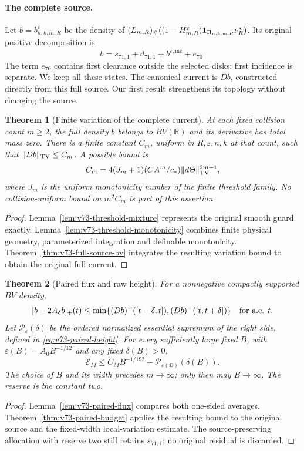 \documentclass[11pt,reqno]{amsart}
\numberwithin{equation}{section}
\newtheorem{revisiontheorem}{Theorem}
\theoremstyle{definition}\newtheorem{definition}[theorem]{Definition}
\theoremstyle{remark}\newtheorem{remark}[theorem]{Remark}
\newcommand{\R}{\mathbb R}\newcommand{\Z}{\mathbb Z}\newcommand{\T}{\mathbb T}
\theoremstyle{definition}\newtheorem{inputstatement}[theorem]{Input statement}
\begin{document}
\paragraph{The complete source.}
Let $b=b^\varepsilon_{n,k,m,R}$ be the density of
$(L_{m,R})_\#((1-H_{m,R}^\varepsilon)\mathbf1_{\Pi_{n,k,m,R}}\nu_R^*)$.
Its original positive decomposition is
\[
 b=s_{71,1}+d_{71,1}+b^{\varepsilon,\mathrm{inc}}+e_{70}.
\]
The term $e_{70}$ contains first clearance outside the selected disks;
first incidence is separate. We keep all these states. The canonical
current is $Db$, constructed directly from this full source. Our first
result strengthens its topology without changing the source.

\begin{revisiontheorem}[Finite variation of the complete current]
\label{thm:intro-v73-bv}
At each fixed collision count $m\ge2$, the full density $b$ belongs to
$BV(\R)$ and its derivative has total mass zero. There is a finite
constant $C_m$, uniform in $R,\varepsilon,n,k$ at that count, such
that $\|Db\|_{\operatorname{TV}}\le C_m$. A possible bound is
\[
 C_m=4(J_m+1)(CA^m/c_*)\|d\Theta\|_{\operatorname{TV}}^{2m+1},
\]
where $J_m$ is the uniform monotonicity number of the finite threshold
family. No collision-uniform bound on $m^2C_m$ is part of this assertion.
\end{revisiontheorem}
\begin{proof}
Lemma~\ref{lem:v73-threshold-mixture} represents the original smooth
guard exactly. Lemma~\ref{lem:v73-threshold-monotonicity} combines
finite physical geometry, parameterized integration and definable
monotonicity. Theorem~\ref{thm:v73-full-source-bv} integrates the
resulting variation bound to obtain the original full current.
\end{proof}

\begin{revisiontheorem}[Paired flux and raw height]
\label{thm:intro-v73-paired}
For a nonnegative compactly supported $BV$ density,
\[
 [b-2A_\delta b]_+(t)
 \le\min\{(Db)^+([t-\delta,t]),(Db)^-([t,t+\delta])\}
 \quad\hbox{for a.e. }t.
\]
Let $\mathcal P_\varepsilon(\delta)$ be the ordered normalized
essential supremum of the right side, defined in
\eqref{eq:v73-paired-height}. For every sufficiently large fixed $B$,
with $\varepsilon(B)=A_0B^{-1/12}$ and any fixed $\delta(B)>0$,
\begin{equation}\label{eq:intro-v73-budget}
 \mathcal E_M\le C_MB^{-1/192}
                  +\mathcal P_{\varepsilon(B)}(\delta(B)).
\end{equation}
The choice of $B$ and its width precedes $m\to\infty$; only then
may $B\to\infty$. The reserve is the constant two.
\end{revisiontheorem}
\begin{proof}
Lemma~\ref{lem:v73-paired-flux} compares both one-sided averages.
Theorem~\ref{thm:v73-paired-budget} applies the resulting bound to
the original source and the fixed-width local-variation estimate.
The source-preserving allocation with reserve two still retains
$s_{71,1}$; no original residual is discarded.
\end{proof}
\end{document}
